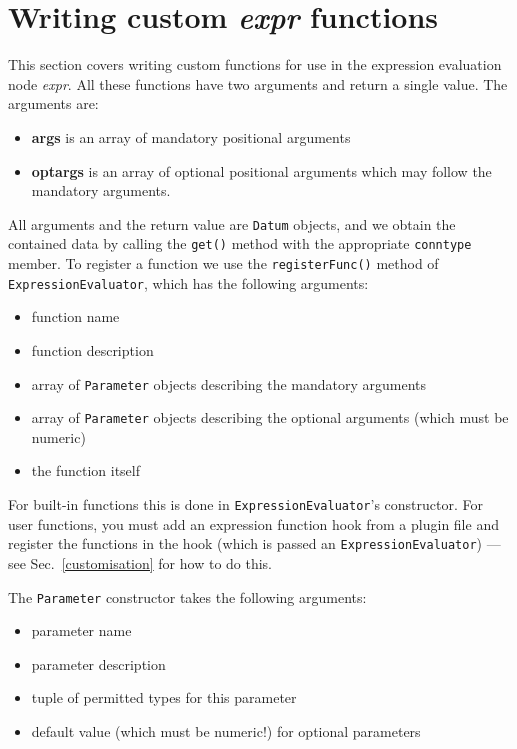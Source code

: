 

\section{Writing custom \emph{expr} functions}
\label{writingfuncs}
This section covers writing custom functions for use in the expression evaluation node \emph{expr}.
All these functions have two arguments and return a single value. The arguments are:
\begin{itemize}
\item \textbf{args} is an array of mandatory positional arguments
\item \textbf{optargs} is an array of optional positional arguments which may follow the mandatory arguments.
\end{itemize}
All arguments and the return value are \texttt{Datum} objects, and we obtain the contained data by calling
the \texttt{get()} method with the appropriate \texttt{conntype} member.
To register a function we use the \texttt{registerFunc()} method of \texttt{ExpressionEvaluator}, which
has the following arguments:
\begin{itemize}
\item function name
\item function description
\item array of \texttt{Parameter} objects describing the mandatory arguments
\item array of \texttt{Parameter} objects describing the optional arguments (which must be numeric)
\item the function itself
\end{itemize}
For built-in functions this is done in \texttt{ExpressionEvaluator}'s
constructor. For user functions, you must add an expression function hook from
a plugin file and register the functions in the hook (which is passed an
\texttt{ExpressionEvaluator}) --- see Sec.~\ref{customisation} for how to do
this.

The \texttt{Parameter} constructor takes the following arguments:
\begin{itemize}
\item parameter name
\item parameter description
\item tuple of permitted types for this parameter
\item default value (which must be numeric!) for optional parameters
\end{itemize}

